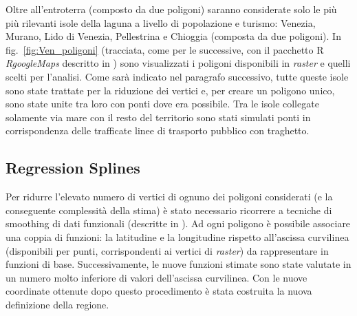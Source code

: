 \documentclass[a4paper,11pt,twoside,openright]{book}							%
\begin{document}
Oltre all'entroterra (composto da due poligoni) saranno considerate solo le più più rilevanti isole della laguna a livello di popolazione e turismo: Venezia, Murano, Lido di Venezia, Pellestrina e Chioggia (composta da due poligoni). In fig.~\ref{fig:Ven_poligoni} (tracciata, come per le successive, con il pacchetto R \textit{RgoogleMaps} descritto in \cite{package:rgooglemaps}) sono visualizzati i poligoni disponibili in \textit{raster} e quelli scelti per l'analisi. Come sarà indicato nel paragrafo successivo, tutte queste isole sono state trattate per la riduzione dei vertici e, per creare un poligono unico, sono state unite tra loro con ponti dove era possibile. Tra le isole collegate solamente via mare con il resto del territorio sono stati simulati ponti in corrispondenza delle trafficate linee di trasporto pubblico con traghetto. 

\subsection{Regression Splines}

Per ridurre l'elevato numero di vertici di ognuno dei poligoni considerati (e la conseguente complessità della stima) è stato necessario ricorrere a tecniche di smoothing di dati funzionali (descritte in \cite{art:ramsaysilverman}). Ad ogni poligono è possibile associare una coppia di funzioni: la latitudine e la longitudine rispetto all'ascissa curvilinea (disponibili per punti, corrispondenti ai vertici di \textit{raster}) da rappresentare in funzioni di base. Successivamente, le nuove funzioni stimate sono state valutate in un numero molto inferiore di valori dell'ascissa curvilinea. Con le nuove coordinate ottenute dopo questo procedimento è stata costruita la nuova definizione della regione.
\end{document}
